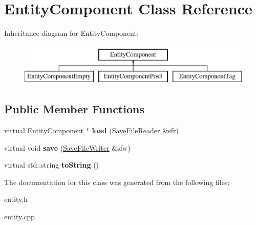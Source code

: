 \hypertarget{class_entity_component}{}\section{Entity\+Component Class Reference}
\label{class_entity_component}
Inheritance diagram for Entity\+Component\+:\begin{figure}[H]
\begin{center}
\leavevmode
\includegraphics[height=2.000000cm]{class_entity_component}
\end{center}
\end{figure}
\subsection*{Public Member Functions}
\begin{DoxyCompactItemize}
\item 
\mbox{\label{class_entity_component_a0c002afd63cb992b135cc8e8b6e22106}} 
virtual \hyperlink{class_entity_component}{Entity\+Component} $\ast$ {\bfseries load} (\hyperlink{class_save_file_reader}{Save\+File\+Reader} \&sfr)
\item 
\mbox{\label{class_entity_component_a812405a882aba0f4faa83c90995d5806}} 
virtual void {\bfseries save} (\hyperlink{class_save_file_writer}{Save\+File\+Writer} \&sfw)
\item 
\mbox{\label{class_entity_component_a89789e02c5b5a6171bbafb8953f226e4}} 
virtual std\+::string {\bfseries to\+String} ()
\end{DoxyCompactItemize}


The documentation for this class was generated from the following files\+:\begin{DoxyCompactItemize}
\item 
entity.\+h\item 
entity.\+cpp\end{DoxyCompactItemize}

